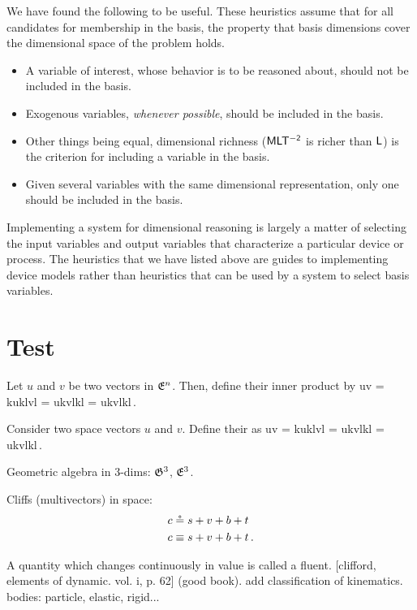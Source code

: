 We have found the following  to be useful. These heuristics assume that for all candidates for membership in the basis, the property that basis dimensions cover the dimensional space of the problem holds.
%
\begin{itemize}
%
\item A variable of interest, whose behavior is to be reasoned about, should not be included in the basis.
%
\item Exogenous variables, \emph{whenever possible}, should be included in the basis. 
%
\item Other things being equal, dimensional richness (\eg $\mathsf{MLT^{-2}}$ is richer than $\mathsf{L}$) is the criterion for including a variable in the basis.
%
\item Given several variables with the same dimensional representation, only one should be included in the basis.
%
\end{itemize}

Implementing a system for dimensional reasoning is largely a matter of selecting the input variables and output variables that characterize a particular device or process. The heuristics that we have listed above are guides to implementing device models rather than heuristics that can be used by a system to select basis variables.


\section{Test}
%
Let $u$ and $v$ be two vectors in $\mathfrak{E}^{n}$. Then, define their inner product by
%
\beq
  u\iprod v = \ifvec k\ivec uk\iprod\ifvec l\ivec vl
            = \ivec uk\ivec vl\ifvec k\iprod\ifvec l
            = \ivec uk\ivec vl\ifmet kl\,.
\eeq

Consider two space vectors $u$ and $v$. Define their  as
%
\beq
  u\iprod v = \ifvec k\ivec uk\iprod\ifvec l\ivec vl
            = \ivec uk\ivec vl\ifvec k\iprod\ifvec l
            = \ivec uk\ivec vl\ifmet kl\,.
\eeq

Geometric algebra in 3-dims: $\mathfrak{G}^3$, $\mathfrak{E}^{3}$.

Cliffs (multivectors) in space:
%
\begin{align*}
  c &\circeq s + v + b + t \\
  c &\equiv s + v + b + t \,.
\end{align*}

A quantity which changes continuously in value is called a fluent. [clifford, elements of dynamic. vol. i, p. 62] (good book). add classification of kinematics. bodies: particle, elastic, rigid...

